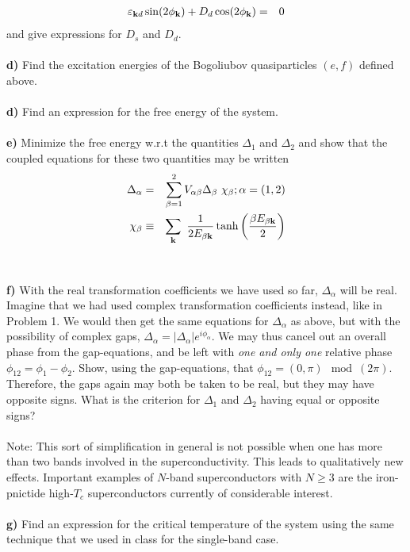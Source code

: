 \begin{problem}
\begin{eqnarray}
		\varepsilon_{{\bf k} d}  \sin(2 \phi_{\bf k}) +    D_d \cos(2 \phi_{\bf k})  & = & 0 \nonumber 
	\end{eqnarray}
	and give expressions for $D_s$ and $D_d$. 
	\ \\
	\ \\
	{\bf d)} Find the excitation energies of the Bogoliubov quasiparticles $(e,f)$ defined above.
	\ \\
	\ \\
	{\bf d)} Find an expression for the free energy of the system.
	\ \\
	\ \\
	{\bf e)} Minimize the free energy w.r.t the quantities $\Delta_1$ and $\Delta_2$ and show that the coupled equations for these two quantities may be written
	\begin{eqnarray}
		\Delta_{\alpha} & = & \sum_{\beta=1}^2 V_{\alpha \beta} \Delta_{\beta} ~ \chi_{\beta};  \alpha = (1,2)  \nonumber \\
		\chi_{\beta} & \equiv & \sum_{\bf k} ~ \frac{1}{2 E_{\beta \bf k} } \tanh \left( \frac{\beta E_{\beta \bf k}}{2} \right) \nonumber
	\end{eqnarray}
	\ \\
	\ \\
	{\bf f)} With the real transformation coefficients we have used so far, $\Delta_\alpha$ will be real. Imagine that we had used complex transformation coefficients instead, like in Problem 1. We would then get the same equations for $\Delta_{\alpha}$ as above, but  with the possibility of complex gaps, $\Delta_{\alpha} = |\Delta_{\alpha}| e^{i \phi_\alpha}$. We may thus cancel out an overall phase from the gap-equations, and be left with {\it one and only one} relative phase $\phi_{12}= \phi_1-\phi_2$. Show, using the gap-equations, that $\phi_{12} = (0,\pi) \mod(2 \pi)$. Therefore, the gaps again may both be taken to be real, but they may have opposite signs. What is the criterion for $\Delta_1$ and $\Delta_2$ having equal or opposite signs?
	\ \\
	\ \\
	Note: This sort of simplification in general is not possible when one has more than two bands involved in the superconductivity. This leads to qualitatively new effects. Important examples of $N$-band superconductors with $N \geq 3$ are the iron-pnictide high-$T_c$ superconductors currently of considerable interest.  
	\ \\
	\ \\
	{\bf g)} Find an expression for the critical temperature of the system using the same technique that we used in class for the single-band case.  
\end{problem}

